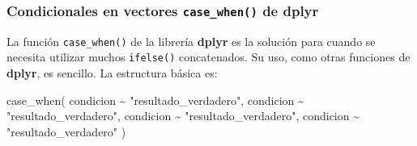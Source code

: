 \documentclass[
]{article}
\newenvironment{Shaded}{\begin{snugshade}}{\end{snugshade}}
\newcommand{\FunctionTok}[1]{\textcolor[rgb]{0.00,0.00,0.00}{#1}}
\newcommand{\NormalTok}[1]{#1}
\newcommand{\SpecialCharTok}[1]{\textcolor[rgb]{0.00,0.00,0.00}{#1}}
\newcommand{\StringTok}[1]{\textcolor[rgb]{0.31,0.60,0.02}{#1}}
\theoremstyle{definition}
\theoremstyle{definition}
\theoremstyle{definition}
\theoremstyle{definition}
\theoremstyle{remark}
\begin{document}
\hypertarget{condicionales-en-vectores-case_when-de-dplyr}{%
\subsubsection{\texorpdfstring{Condicionales en vectores \texttt{case\_when()} de \textbf{dplyr}}{Condicionales en vectores case\_when() de dplyr}}\label{condicionales-en-vectores-case_when-de-dplyr}}

La función \texttt{case\_when()} de la librería \textbf{dplyr} es la solución para cuando se necesita utilizar muchos \texttt{ifelse()} concatenados. Su uso, como otras funciones de \textbf{dplyr}, es sencillo. La estructura básica es:

\begin{Shaded}
\begin{Highlighting}[]
\FunctionTok{case\_when}\NormalTok{(}
\NormalTok{  condicion }\SpecialCharTok{\textasciitilde{}} \StringTok{"resultado\_verdadero"}\NormalTok{,}
\NormalTok{  condicion }\SpecialCharTok{\textasciitilde{}} \StringTok{"resultado\_verdadero"}\NormalTok{,}
\NormalTok{  condicion }\SpecialCharTok{\textasciitilde{}} \StringTok{"resultado\_verdadero"}\NormalTok{,}
\NormalTok{  condicion }\SpecialCharTok{\textasciitilde{}} \StringTok{"resultado\_verdadero"}
\NormalTok{)}
\end{Highlighting}
\end{Shaded}
\end{document}
